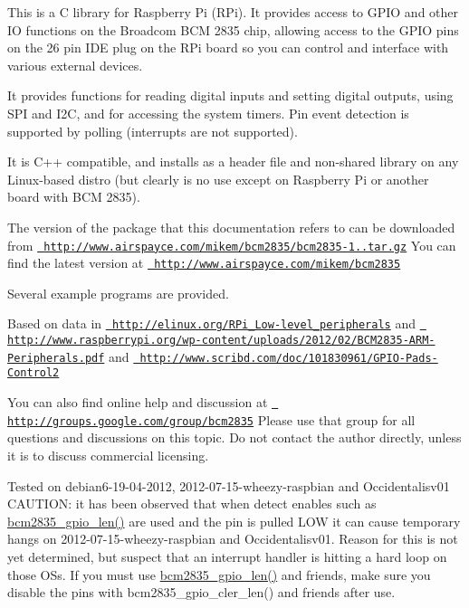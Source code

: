 This is a C library for Raspberry Pi (RPi). It provides access to GPIO and other IO functions on the Broadcom BCM 2835 chip, allowing access to the GPIO pins on the 26 pin IDE plug on the RPi board so you can control and interface with various external devices.

It provides functions for reading digital inputs and setting digital outputs, using SPI and I2C, and for accessing the system timers. Pin event detection is supported by polling (interrupts are not supported).

It is C++ compatible, and installs as a header file and non-\/shared library on any Linux-\/based distro (but clearly is no use except on Raspberry Pi or another board with BCM 2835).

The version of the package that this documentation refers to can be downloaded from \href{http://www.airspayce.com/mikem/bcm2835/bcm2835-1.26.tar.gz}{\texttt{ http\+://www.\+airspayce.\+com/mikem/bcm2835/bcm2835-\/1..\+tar.\+gz}} You can find the latest version at \href{http://www.airspayce.com/mikem/bcm2835}{\texttt{ http\+://www.\+airspayce.\+com/mikem/bcm2835}}

Several example programs are provided.

Based on data in \href{http://elinux.org/RPi_Low-level_peripherals}{\texttt{ http\+://elinux.\+org/\+RPi\+\_\+\+Low-\/level\+\_\+peripherals}} and \href{http://www.raspberrypi.org/wp-content/uploads/2012/02/BCM2835-ARM-Peripherals.pdf}{\texttt{ http\+://www.\+raspberrypi.\+org/wp-\/content/uploads/2012/02/\+BCM2835-\/\+ARM-\/\+Peripherals.\+pdf}} and \href{http://www.scribd.com/doc/101830961/GPIO-Pads-Control2}{\texttt{ http\+://www.\+scribd.\+com/doc/101830961/\+GPIO-\/\+Pads-\/\+Control2}}

You can also find online help and discussion at \href{http://groups.google.com/group/bcm2835}{\texttt{ http\+://groups.\+google.\+com/group/bcm2835}} Please use that group for all questions and discussions on this topic. Do not contact the author directly, unless it is to discuss commercial licensing.

Tested on debian6-\/19-\/04-\/2012, 2012-\/07-\/15-\/wheezy-\/raspbian and Occidentalisv01 CAUTION\+: it has been observed that when detect enables such as \mbox{\hyperlink{group__gpio_ga8e990d48db929445ac3e899ca0f5ed07}{bcm2835\+\_\+gpio\+\_\+len()}} are used and the pin is pulled LOW it can cause temporary hangs on 2012-\/07-\/15-\/wheezy-\/raspbian and Occidentalisv01. Reason for this is not yet determined, but suspect that an interrupt handler is hitting a hard loop on those OSs. If you must use \mbox{\hyperlink{group__gpio_ga8e990d48db929445ac3e899ca0f5ed07}{bcm2835\+\_\+gpio\+\_\+len()}} and friends, make sure you disable the pins with bcm2835\+\_\+gpio\+\_\+cler\+\_\+len() and friends after use.

